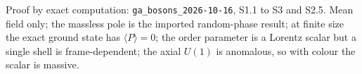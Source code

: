 Proof by exact computation: \texttt{ga\_bosons\_2026-10-16}, S1.1 to S3 and S2.5. Mean field only; the massless pole is the imported random-phase result; at finite size the exact ground state has $\langle P\rangle = 0$; the order parameter is a Lorentz scalar but a single shell is frame-dependent; the axial $U(1)$ is anomalous, so with colour the scalar is massive.
